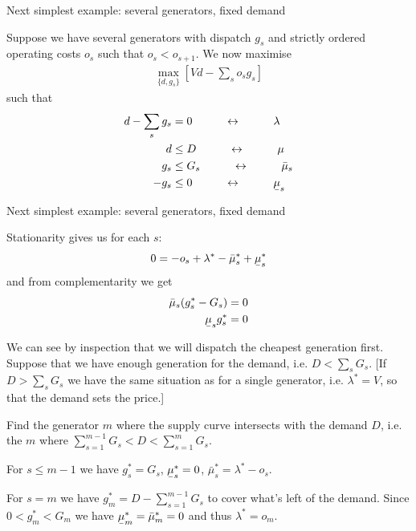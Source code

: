 \documentclass[10pt,aspectratio=169,dvipsnames]{beamer}
\def\l{\lambda}
\def\m{\mu}
\newcommand{\ubar}[1]{\text{\b{$#1$}}}
\begin{document}
\begin{frame}{Next simplest example: several generators, fixed demand}

  Suppose we have several generators with dispatch $g_s$ and strictly ordered
  operating costs $o_s$ such that $o_s < o_{s+1}$. We now maximise
  \begin{align*}
    \max_{\{d, g_s\}}  \left[ Vd  -  \sum_s o_s g_s \right]
  \end{align*}
  such that
  \begin{align*}
    d -  \sum_s g_s  & = 0 \hspace{1cm} \leftrightarrow \hspace{1cm} \l \\
    d & \leq D  \hspace{1cm} \leftrightarrow \hspace{1cm} \m \\
        g_s  & \leq  G_s  \hspace{1cm}\leftrightarrow\hspace{1cm} \bar{\m}_s \\
    - g_s  & \leq  0  \hspace{1cm}\leftrightarrow\hspace{1cm} \ubar{\m}_s
  \end{align*}


\end{frame}

\begin{frame}{Next simplest example: several generators, fixed demand}

  Stationarity gives us for each $s$:
  \begin{align*}
    0 = -o_s + \l^* - \bar{\m}^*_s + \ubar{\m}^*_s
  \end{align*}
  and from complementarity we get
  \begin{align*}
    \bar{\m}_s(g_s^* - G_s) & = 0 \\
    \ubar{\m}_sg_s^* & = 0
  \end{align*}

  We can see by inspection that we will dispatch the cheapest
  generation first. Suppose that we have enough generation for the
  demand, i.e. $D < \sum_s G_s$. [If $D > \sum_s G_s$ we have the same
    situation as for a single generator, i.e. $\l^* = V$, so that the demand sets the price.]

  Find the generator $m$ where the supply curve intersects with the demand $D$, i.e. the $m$ where $\sum_{s=1}^{m-1} G_s < D < \sum_{s=1}^{m}
  G_s$.

  For $s \leq m-1$ we have $g_s^* = G_s$, $\ubar{\m}^*_s = 0$,
  $\bar{\m}^*_s =  \l^* - o_s$.

  For $s = m$ we have $g_m^* = D - \sum_{s=1}^{m-1} G_s$ to cover
  what's left of the demand. Since $0 < g_m^* < G_m$ we have
  $\ubar{\m}^*_m = \bar{\m}^*_m = 0$ and thus $\l^* = o_m$.


\end{frame}
\end{document}
